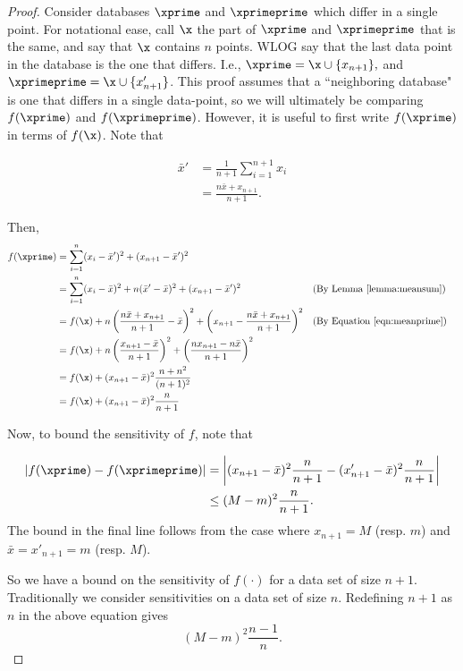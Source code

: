 \documentclass[11pt]{scrartcl} %
\begin{document}
\begin{proof}
Consider databases $\xprime$ and $\xprimeprime$ which differ in a single point. For notational ease, call $\x$ the part of $\xprime$ and $\xprimeprime$
that is the same, and say that $\x$ contains $n$ points. WLOG say that the last data point in the database is the one that differs. I.e.,
$\xprime = \x \cup \{x_{n+1}\},$ and $\xprimeprime = \x \cup \{x'_{n+1}\}$. This proof assumes that a ``neighboring database" is one that differs in a single
data-point, so we will ultimately be comparing $f(\xprime)$ and $f(\xprimeprime)$. However, it is useful to first write $f(\xprime)$ in terms of $f(\x)$.
Note that

\begin{align}
\label{eqn:meanprime}
\bar{x}' &= \frac{1}{n+1} \sum_{i=1}^{n+1} x_i \nonumber \\
	&= \frac{n\bar{x} + x_{n+1}}{n+1}.
\end{align}

Then,
\begin{align}
\label{eq:varAddOnePoint}
f(\xprime) &= \sum_{i=1}^n (x_i - \bar{x}')^2 + (x_{n+1} - \bar{x}')^2 \notag\\
	&= \sum_{i=1}^n (x_i - \bar{x})^2 + n(\bar{x}'-\bar{x})^2 + (x_{n+1} - \bar{x}')^2 &&\text{(By Lemma \ref{lemma:meansum})} \notag\\
	&= f(\x) + n\left( \frac{n\bar{x} + x_{n+1}}{n+1}-\bar{x}\right)^2 + \left(x_{n+1} - \frac{n\bar{x} + x_{n+1}}{n+1} \right)^2 &&\text{(By Equation \ref{eqn:meanprime})} \notag\\
	&= f(\x) + n\left(\frac{x_{n+1}-\bar{x}}{n+1}\right)^2 + \left( \frac{nx_{n+1}-n\bar{x}}{n+1}\right)^2 \notag\\
	&= f(\x) + (x_{n+1}-\bar{x})^2 \frac{n+n^2}{(n+1)^2} \notag\\
	&= f(\x) + (x_{n+1}-\bar{x})^2 \frac{n}{n+1} \notag\\
\end{align}

Now, to bound the sensitivity of $f$, note that

\begin{align}
	\label{eq:l1_np1_bound}
\left\vert f(\xprime) - f(\xprimeprime) \right\vert &= \left\vert (x_{n+1}-\bar{x})^2 \frac{n}{n+1} - (x_{n+1}'-\bar{x})^2 \frac{n}{n+1} \right\vert \\
	&\le (M-m)^2 \frac{n}{n+1}. \nonumber
\end{align}
The bound in the final line follows from the case where $x_{n+1} = M$ (resp. $m$) and $\bar{x} = x'_{n+1} = m$ (resp. $M$). \newline

So we have a bound on the sensitivity of $f(\cdot)$ for a data set of size $n+1$. Traditionally we consider sensitivities on a data set of size $n$.
Redefining $n+1$ as $n$ in the above equation gives
$$ (M-m)^2 \frac{n-1}{n}. $$
\end{proof}
\end{document}
